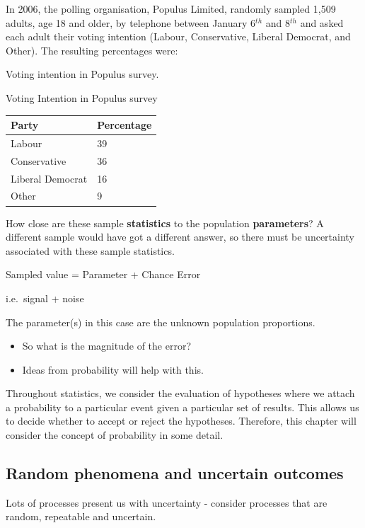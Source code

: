 \documentclass[
  oneside]{krantz}
\providecommand{\tightlist}{%
  \setlength{\itemsep}{0pt}\setlength{\parskip}{0pt}}
\begin{document}
In 2006, the polling organisation, Populus Limited, randomly sampled 1,509 adults, age 18 and older, by telephone between January 6\(^{th}\) and 8\(^{th}\) and asked each adult their voting intention (Labour, Conservative, Liberal Democrat, and Other). The resulting percentages were:

\label{tab:Votint} Voting intention in Populus survey.

\begin{table}
\label{Votint}
\caption{Voting Intention in Populus survey}
\end{table}

\begin{longtable}[]{@{}ll@{}}
\toprule
Party & Percentage\tabularnewline
\midrule
\endhead
Labour & 39\tabularnewline
Conservative & 36\tabularnewline
Liberal Democrat & 16\tabularnewline
Other & 9\tabularnewline
\bottomrule
\end{longtable}

How close are these sample \textbf{statistics} to the population \textbf{parameters}? A different sample would have got a different answer, so there must be uncertainty associated with these sample statistics.

Sampled value = Parameter + Chance Error

i.e.~signal + noise

The parameter(s) in this case are the unknown population proportions.

\begin{itemize}
\tightlist
\item
  So what is the magnitude of the error?
\item
  Ideas from probability will help with this.
\end{itemize}

Throughout statistics, we consider the evaluation of hypotheses where we attach a probability to a particular event given a particular set of results. This allows us to decide whether to accept or reject the hypotheses. Therefore, this chapter will consider the concept of probability in some detail.

\hypertarget{random-phenomena-and-uncertain-outcomes}{%
\subsection{Random phenomena and uncertain outcomes}\label{random-phenomena-and-uncertain-outcomes}}

Lots of processes present us with uncertainty - consider processes that are random, repeatable and uncertain.
\end{document}
